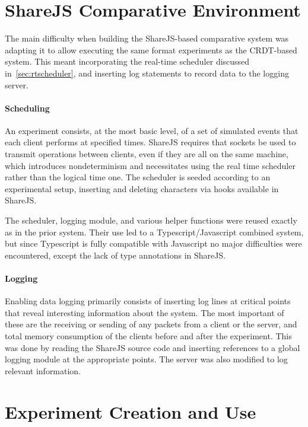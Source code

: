 \documentclass[12pt,a4paper,twoside,openright]{report}
\begin{document}
	
	
\section{ShareJS Comparative Environment} \label{sec:comparative}

	The main difficulty when building the ShareJS-based comparative system was adapting it to allow executing the same format experiments as the CRDT-based system. This meant incorporating the real-time scheduler discussed in~\cref{sec:rtscheduler}, and inserting log statements to record data to the logging server.
	
	\paragraph{Scheduling}
	An experiment consists, at the most basic level, of a set of simulated events that each client performs at specified times. ShareJS requires that sockets be used to transmit operations between clients, even if they are all on the same machine, which introduces nondeterminism and necessitates using the real time scheduler rather than the logical time one. The scheduler is seeded according to an experimental setup, inserting and deleting characters via hooks available in ShareJS.
	
	The scheduler, logging module, and various helper functions were reused exactly as in the prior system. Their use led to a Typescript/Javascript combined system, but since Typescript is fully compatible with Javascript no major difficulties were encountered, except the lack of type annotations in ShareJS.
	
	\paragraph{Logging}
	Enabling data logging primarily consists of inserting log lines at critical points that reveal interesting information about the system. The most important of these are the receiving or sending of any packets from a client or the server, and total memory consumption of the clients before and after the experiment. This was done by reading the ShareJS source code and inserting references to a global logging module at the appropriate points. The server was also modified to log relevant information.
	
\section{Experiment Creation and Use} \label{sec:experimentcreation}
\end{document}
